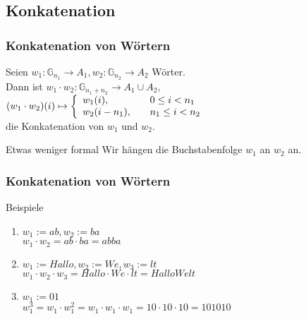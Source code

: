 \subsection{Konkatenation}
\begin{frame}
  \frametitle{Konkatenation von Wörtern}
  \begin{definition}
    Seien $w_1: \mathbb{G}_{n_1} \rightarrow A_1, w_2: \mathbb{G}_{n_2} \rightarrow A_2$ Wörter.\\
    Dann ist $w_1 \cdot w_2: \mathbb{G}_{n_1 + n_2} \rightarrow A_1 \cup A_2,$
    $(w_1 \cdot w_2)(i) \mapsto \left\{
        \begin{array}{l l}
          w_1(i), & \quad 0 \leq i < n_1\\
          w_2(i-n_1), & \quad n_1 \leq i < n_2\\
        \end{array} \right.
    $\\
    die Konkatenation von $w_1$ und $w_2$.
  \end{definition}\pause
  \begin{alertblock}{Etwas weniger formal}
    Wir hängen die Buchstabenfolge $w_1$ an $w_2$ an.
  \end{alertblock}
\end{frame}
\begin{frame}
  \frametitle{Konkatenation von Wörtern}
  \begin{exampleblock}{Beispiele}
    \begin{enumerate}
      \item $w_1 := ab, w_2 := ba$\\
             $w_1 \cdot w_2 = ab \cdot ba = abba$
      \item $w_1 := Hallo, w_2 := We, w_3 := lt$\\
             $w_1 \cdot w_2  \cdot w_3 = Hallo \cdot We \cdot lt = HalloWelt$
      \item $w_1 := 01$\\
             $w_1^3 = w_1 \cdot w_1^2 = w_1 \cdot w_1 \cdot w_1 = 10 \cdot 10 \cdot 10 = 101010$
    \end{enumerate}
  \end{exampleblock}
\end{frame}

